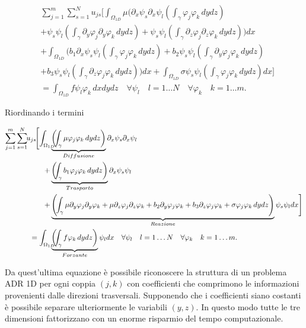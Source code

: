 \begin{equation*}
\begin{split}
&\sum_{j=1}^m \sum_{s=1}^N
u_{js} \Bigg[ \int_{\Omega_{1D}}\mu\Bigg( \partial_x\psi_s \partial_x\psi_l\left(\int_{\gamma}\varphi _j\varphi _k\,dydz\right)\\
&+ \psi_s \psi_l \left(\int_{\gamma}\partial_y\varphi _j\partial_y\varphi _k\,dydz\right)
+ \psi_s \psi_l \left(\int_{\gamma}\partial_z\varphi _j\partial_z\varphi _k\,dydz\right)\Bigg)dx \\
&+ \int_{\Omega_{1D}}\Bigg( b_1\partial_x\psi_s\psi_l\left(\int_{\gamma}\varphi _j\varphi_k\,dydz\right)	
                    + b_2\psi_s          \psi_l\left(\int_{\gamma}\partial_y\varphi _j\varphi _k\,dydz\right)\\
&                    + b_3\psi_s          \psi_l\left(\int_{\gamma}\partial_z\varphi_j\varphi _k\,dydz\right)\Bigg)dx
+\int_{\Omega_{1D}} \sigma\psi_s\psi_l\left(\int_{\gamma}\varphi _j\varphi _k\,dydz\right)dx \Bigg]\\
&=\int_{\Omega_{1D}} f\psi_l\varphi _k\,dxdydz\quad \forall \psi_l\quad l=1\ldots N\quad\forall \varphi_k\quad k=1\ldots m.
\end{split}
\end{equation*}

Riordinando i termini

{\footnotesize
\begin{equation}
\begin{split}
\sum_{j=1}^m \sum_{s=1}^N\nsp{2}
u_{js}\nsp{1} \Bigg[\nsp{1}\int_{\Omega_{1D}}\nsp{4}&\underbrace{\left(\nsp{2}\int_{\gamma}\mu\varphi _j\varphi _k\,dydz\right)}_{Diffusione}
\partial_x\psi_s \partial_x\psi_l\\
+&\underbrace{\left(\nsp{2}\int_{\gamma}b_1\varphi _j\varphi_k\,dydz\right)}_{Trasporto}\partial_x\psi_s\psi_l\\
+&\underbrace{\Bigg(\nsp{2}\int_{\gamma}\mu\partial_y\varphi _j\partial_y\varphi _k
+ \mu\partial_z\varphi _j\partial_z\varphi _k
+ b_2\partial_y\varphi _j\varphi _k
+ b_3\partial_z\varphi_j\varphi _k
+ \sigma\varphi _j\varphi _k\,dydz\Bigg)}_{Reazione} \psi_s \psi_l dx \Bigg]\\
=\int_{\Omega_{1D}}\nsp{4}&\underbrace{\left(\nsp{2}\int_{\gamma}f\varphi _k\,dydz\right)}_{Forzante} \psi_ldx\quad \forall \psi_l\quad l=1\ldots N\quad\forall \varphi_k\quad k=1\ldots m. 
\end{split}
\end{equation}}

Da quest'ultima equazione \`e possibile riconoscere la struttura di un problema ADR 1D per ogni coppia $(j,k)$ con coefficienti che
comprimono le informazioni provenienti dalle direzioni trasversali.
Supponendo che i coefficienti siano costanti \`e possibile separare ulteriormente le variabili $(y,z)$. In questo modo
tutte le tre dimensioni fattorizzano con un enorme risparmio del tempo computazionale.

